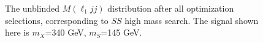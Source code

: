 \begin{figure}[h]
\begin{minipage}[t]{0.33\linewidth}
 \end{minipage}
\caption{The unblinded $M(\ell_{1}jj)$ distribution after all optimization selections, corresponding to $SS$ high mass search. The signal shown here is $m_X$=340 GeV, $m_S$=145 GeV.}
\label{fig:SigOpt:H340_S165_m_l1jj.pdf}
\end{figure}
